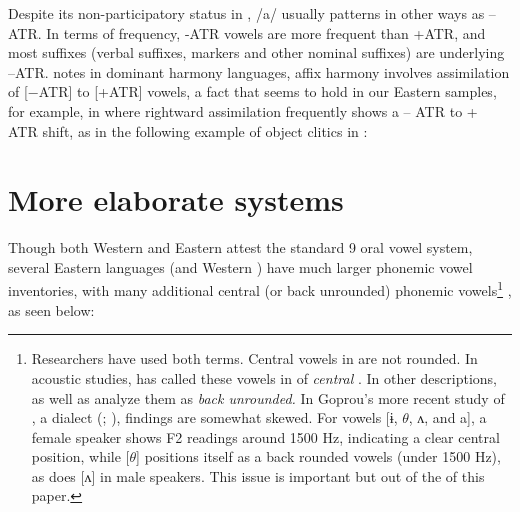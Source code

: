 \documentclass[output=paper
,newtxmath
,modfonts
,nonflat]{langsci/langscibook}
\begin{document}
Despite its non-participatory status in , /a/ usually patterns in other ways as –ATR. In terms of frequency, -ATR vowels are more frequent than +ATR, and most suffixes (verbal suffixes,  markers and other nominal suffixes) are underlying –ATR. \citet{Casali2008} notes in dominant harmony languages, affix harmony involves assimilation of [$-$ATR] to [+ATR] vowels, a fact that seems to hold in our Eastern  samples, for example, in  where rightward assimilation frequently shows a – ATR to + ATR shift, as in the following example of object clitics in :


\ea%
    \label{ex:zogbo:3}
		 \citep{Marchese1975}
    \z







\section{More elaborate systems}\label{sec:zogbo:2} 

Though both Western and Eastern  attest the standard 9 oral vowel system, several Eastern  languages (and Western ) have much larger phonemic vowel inventories, with many additional central (or back unrounded) phonemic vowels\footnote{Researchers have used both terms.  Central vowels in  are not rounded. In acoustic studies, \citet{grégoire1972} has called these vowels in  of  \textit{central} \citep[see also][15]{Zogbo1981}. In other descriptions, \citet[61]{Werle1976} as well as \citet[7]{kipre2005} analyze them as \textit{back unrounded.} In Goprou’s more recent study of , a  dialect (\citeyear{Goprou2010}; \citeyear[177]{Goprou2014}), findings are somewhat skewed. For vowels [ɨ, $\theta $, ʌ, and a], a female speaker shows F2 readings around 1500 Hz, indicating a clear central position, while [$\theta $] positions itself as a back rounded vowels (under 1500 Hz), as does [ʌ] in male speakers. This issue is important but out of the  of this paper.} , as seen below:
\end{document}
